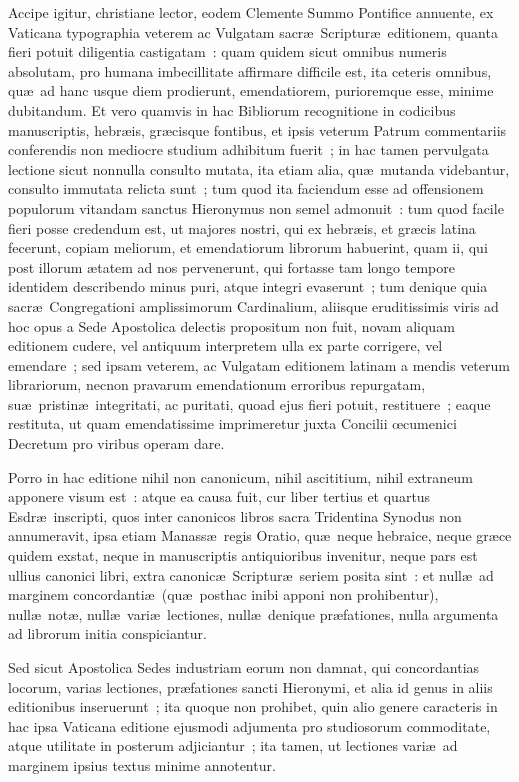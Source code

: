 Accipe igitur, christiane lector, eodem Clemente Summo Pontifice annuente, ex 
Vaticana typographia veterem ac Vulgatam sacr\ae\ Scriptur\ae\ editionem, 
quanta fieri potuit diligentia castigatam~: quam quidem sicut omnibus numeris 
absolutam, pro humana imbecillitate affirmare difficile est, ita ceteris 
omnibus, qu\ae\ ad hanc usque diem prodierunt, emendatiorem, purioremque esse, 
minime dubitandum. Et vero quamvis in hac Bibliorum recognitione in codicibus 
manuscriptis, hebr\ae is, gr\ae cisque fontibus, et ipsis veterum Patrum 
commentariis conferendis non mediocre studium adhibitum fuerit~; in hac tamen 
pervulgata lectione sicut nonnulla consulto mutata, ita etiam alia, qu\ae\ 
mutanda videbantur, consulto immutata relicta sunt~; tum quod ita faciendum esse 
ad offensionem populorum vitandam sanctus Hieronymus non semel admonuit~: tum 
quod facile fieri posse credendum est, ut majores nostri, qui ex hebr\ae is, et 
gr\ae cis latina fecerunt, copiam meliorum, et emendatiorum librorum habuerint, 
quam ii, qui post illorum \ae tatem ad nos pervenerunt, qui fortasse tam longo 
tempore identidem describendo minus puri, atque integri evaserunt~; tum denique 
quia sacr\ae\ Congregationi amplissimorum Cardinalium, aliisque eruditissimis 
viris ad hoc opus a Sede Apostolica delectis propositum non fuit, novam aliquam 
editionem cudere, vel antiquum interpretem ulla ex parte corrigere, vel 
emendare~; sed ipsam veterem, ac Vulgatam editionem latinam a mendis veterum 
librariorum, necnon pravarum emendationum erroribus repurgatam, su\ae\ 
pristin\ae\ integritati, ac puritati, quoad ejus fieri potuit, restituere~; 
eaque restituta, ut quam emendatissime imprimeretur juxta Concilii \oe cumenici 
Decretum pro viribus operam dare.

Porro in hac editione nihil non canonicum, nihil ascititium, nihil extraneum 
apponere visum est~: atque ea causa fuit, cur liber tertius et quartus Esdr\ae\ 
inscripti, quos inter canonicos libros sacra Tridentina Synodus non 
annumeravit, ipsa etiam Manass\ae\ regis Oratio, qu\ae\ neque hebraice, neque 
gr\ae ce quidem exstat, neque in manuscriptis antiquioribus invenitur, neque 
pars est ullius canonici libri, extra canonic\ae\ Scriptur\ae\ seriem posita 
sint~: et null\ae\ ad marginem concordanti\ae\ (qu\ae\ posthac inibi apponi non 
prohibentur), null\ae\ not\ae , null\ae\ vari\ae\ lectiones, null\ae\ denique 
pr\ae fationes, nulla argumenta ad librorum initia conspiciantur.

Sed sicut Apostolica Sedes industriam eorum non damnat, qui concordantias 
locorum, varias lectiones, pr\ae fationes sancti Hieronymi, et alia id genus in 
aliis editionibus inseruerunt~; ita quoque non prohibet, quin alio genere 
caracteris in hac ipsa Vaticana editione ejusmodi adjumenta pro studiosorum 
commoditate, atque utilitate in posterum adjiciantur~; ita tamen, ut lectiones 
vari\ae\ ad marginem ipsius textus minime annotentur.\enlargethispage{\baselineskip}
\addtocontents{toc}{\vspace{24pt}\textsc{Antiquum Testamentum}}
\addtocontents{toc}{\vspace{12pt}}

